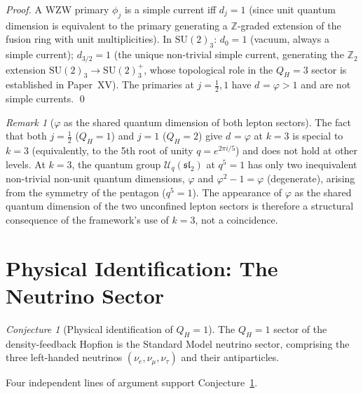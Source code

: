 \documentclass[11pt,a4paper]{article}
\theoremstyle{definition}\newtheorem{definition}[theorem]{Definition}
\theoremstyle{remark}
\newtheorem{remark}[theorem]{Remark}
\newtheorem{conjecture}[theorem]{Conjecture}
\newcommand{\vp}{\varphi}
\newcommand{\SU}{\mathrm{SU}}
\newcommand{\QH}{Q_H}
\newcommand{\Ztwo}{\mathbb{Z}_2}
\newcommand{\dimq}[1]{d_{#1}}
\begin{document}
\begin{proof}
A WZW primary $\phi_j$ is a simple current iff $\dimq{j}=1$ (since
unit quantum dimension is equivalent to the primary generating a
$\mathbb{Z}$-graded extension of the fusion ring with unit multiplicities).
In $\SU(2)_3$: $\dimq{0}=1$ (vacuum, always a simple current);
$\dimq{3/2}=1$ (the unique non-trivial simple current, generating the
$\Ztwo$ extension $\SU(2)_3\to\SU(2)_3^+$, whose topological role in
the $\QH=3$ sector is established in Paper~XV). The primaries at
$j=\tfrac12,1$ have $\dimq{}=\vp>1$ and are not simple currents.
\qed
\end{proof}

\begin{remark}[$\vp$ as the shared quantum dimension of both lepton sectors]
\label{P17:rem:phi_unconfined}
The fact that both $j=\tfrac12$ ($\QH=1$) and $j=1$ ($\QH=2$) give
$\dimq{}=\vp$ at $k=3$ is special to $k=3$ (equivalently, to the
5th root of unity $q=e^{2\pi i/5}$) and does not hold at other levels.
At $k=3$, the quantum group $\mathcal{U}_q(\mathfrak{sl}_2)$ at
$q^5=1$ has only two inequivalent non-trivial non-unit quantum
dimensions, $\vp$ and $\vp^2-1=\vp$ (degenerate), arising from the
symmetry of the pentagon ($q^5=1$). The appearance of $\vp$ as the
shared quantum dimension of the two unconfined lepton sectors is
therefore a structural consequence of the framework's use of $k=3$,
not a coincidence.
\end{remark}

\section{Physical Identification: The Neutrino Sector}
\label{P17:sec:physical}

\begin{conjecture}[Physical identification of $\QH=1$]
\label{P17:conj:nu_identification}
The $\QH=1$ sector of the density-feedback Hopfion is the Standard
Model neutrino sector, comprising the three left-handed neutrinos
$(\nu_e,\nu_\mu,\nu_\tau)$ and their antiparticles.
\end{conjecture}

Four independent lines of argument support
Conjecture~\ref{P17:conj:nu_identification}.
\end{document}
